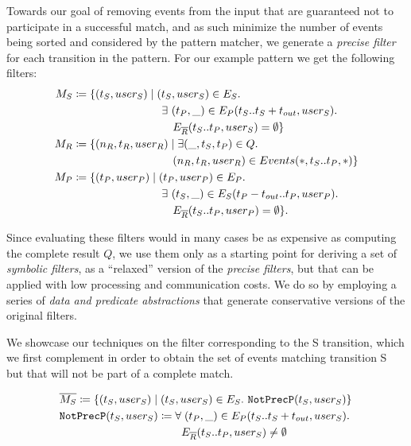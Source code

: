 Towards our goal of removing events from the input that are guaranteed not to
participate in a successful match, and as such minimize the number of events
being sorted and considered by the pattern matcher, we
generate a {\em precise filter} for each transition in the pattern. 
For our example pattern we get the following filters:
\begin{align*}
M_S 
&\coloneq 
\{ (t_S, user_S) \mid 
   (t_S, user_S) \in E_S .\
\\
&\qqqquad 
   \exists\ (t_P, \_) \in E_P(t_S..t_S + t_{out}, user_S) .\ 
\\
&\qqqquad\quad
   E_{\oR}(t_S..t_P, user_S) = \emptyset 
\}
\\
M_R 
&\coloneq 
\{ (n_R, t_R, user_R) \mid 
   \exists (\_, t_S, t_P) \in Q .\ 
\\
&\qqqquad\quad
   (n_R, t_R, user_R) \in Events(*, t_S..t_P, *) 
\}
\\
M_P 
&\coloneq 
\{ (t_P, user_P) \mid  
   (t_P, user_P) \in E_P .\ 
\\
&\qqqquad
   \exists\ (t_S, \_) \in E_S(t_P-t_{out}..t_P, user_P) .\ 
\\
&\qqqquad\quad
   E_{\oR}(t_S..t_P, user_P) = \emptyset 
\}.
\end{align*}

Since evaluating these filters would in many cases be as expensive as computing
the complete result $Q$, we use them only as a starting point for deriving a set
of {\em symbolic filters}, as a ``relaxed'' version of the {\em precise
filters}, but that can be applied with low processing and communication costs.
We do so by employing a series of {\em data and predicate abstractions} 
that generate conservative versions of the original filters.


We showcase our techniques on the filter corresponding to the S transition,
which we first complement in order to obtain the set of events matching
transition S but that will not be part of a complete match.

\newcommand{\oMS}{\overline{M_S}}
\newcommand{\NotExistsP}{\ident{NotExistsP}}
\newcommand{\NotPrecedesP}{\ident{NotPrecP}}

\newcommand{\interval}[1]{\lfloor #1 \rceil}
\newcommand{\uinterval}[1]{\lceil #1 \rfloor}
\newcommand{\hashid}[1]{\langle #1 \rangle}


\begin{align*}
&
\oMS \coloneq 
\{ (t_S, user_S) \mid (t_S, user_S) \in E_S .\ 
   \NotPrecedesP(t_S, user_S) 
\}
\\
&
\NotPrecedesP(t_S, user_S) \coloneq 
\forall\; (t_P, \_) \in E_P(t_S..t_S + t_{out}, user_S) .\ 
\\
&\qqqquad\qquad\quad
E_{\oR}(t_S..t_P, user_S) \neq \emptyset 
\end{align*}

